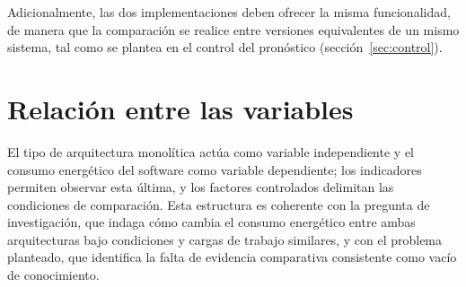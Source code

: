 Adicionalmente, las dos implementaciones deben ofrecer la misma funcionalidad, de manera que la comparación se realice entre versiones equivalentes de un mismo sistema, tal como se plantea en el control del pronóstico (sección~\ref{sec:control}).

\section{Relación entre las variables}

El tipo de arquitectura monolítica actúa como variable independiente y el consumo energético del software como variable dependiente; los indicadores permiten observar esta última, y los factores controlados delimitan las condiciones de comparación. Esta estructura es coherente con la pregunta de investigación, que indaga cómo cambia el consumo energético entre ambas arquitecturas bajo condiciones y cargas de trabajo similares, y con el problema planteado, que identifica la falta de evidencia comparativa consistente como vacío de conocimiento.
